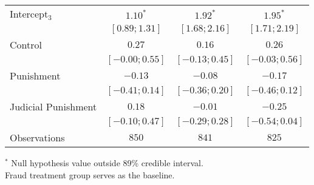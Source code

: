 \begin{table}[h]
\begin{center}
\begin{threeparttable}
\begin{tabular}{l c c c}
Intercept$_3$       & $1.10^{*}$        & $1.92^{*}$        & $1.95^{*}$        \\
                    & $ [ 0.89;  1.31]$ & $ [ 1.68;  2.16]$ & $ [ 1.71;  2.19]$ \\
Control             & $0.27$            & $0.16$            & $0.26$            \\
                    & $ [-0.00;  0.55]$ & $ [-0.13;  0.45]$ & $ [-0.03;  0.56]$ \\
Punishment          & $-0.13$           & $-0.08$           & $-0.17$           \\
                    & $ [-0.41;  0.14]$ & $ [-0.36;  0.20]$ & $ [-0.46;  0.12]$ \\
Judicial Punishment & $0.18$            & $-0.01$           & $-0.25$           \\
                    & $ [-0.10;  0.47]$ & $ [-0.29;  0.28]$ & $ [-0.54;  0.04]$ \\
\hline
Observations        & $850$             & $841$             & $825$             \\
\hline
\end{tabular}
\begin{tablenotes}[flushleft]
\scriptsize{$^*$ Null hypothesis value outside 89\% credible interval.  \\
Fraud treatment group serves as the baseline.}
\end{tablenotes}
\end{threeparttable}
\label{table:ol_main_la_npol_872}
\end{center}
\end{table}
